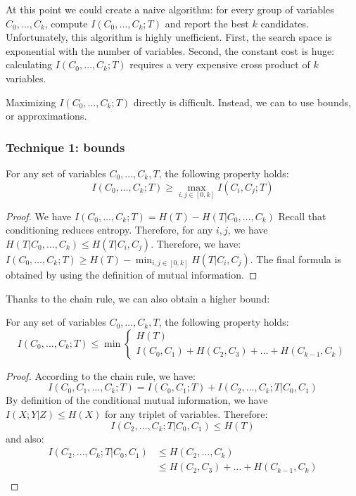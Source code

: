 At this point we could create a naive algorithm: for every group of variables
$C_0, \ldots,C_k$, compute $I(C_0, \ldots, C_k; T)$ and report the best $k$
candidates.
Unfortunately, this algorithm is highly unefficient. First, the search space is
exponential with the number of variables. Second, the constant cost is huge:
calculating $I(C_0, \ldots, C_k; T)$ requires a very expensive cross product of
$k$ variables.

Maximizing $I(C_0, \ldots, C_k; T)$ directly is difficult.  Instead, we can
to use bounds, or approximations.

\subsubsection{Technique 1: bounds}

\begin{lemma}
    For any set of variables $C_0, \ldots, C_k, T$, the following property holds:
    $$
        I(C_0, \ldots, C_k; T) \geq \max_{i,j\in [0,k]} I(C_i, C_j ; T)
    $$
\end{lemma}

\begin{proof}
    We have $I(C_0, \ldots, C_k; T) = H(T) - H(T|C_0, \ldots, C_k)$ Recall that
    conditioning reduces entropy. Therefore, for any $i,j$, we have $H(T|C_0,
    \ldots, C_k) \leq H(T |C_i, C_j)$. Therefore, we have:
    $I(C_0, \ldots, C_k; T) \geq H(T) - \min_{i,j\in [0,k]} H(T | C_i, C_j)$.
    The final formula is obtained by using the definition of mutual
    information.
\end{proof}

Thanks to the chain rule, we can also obtain a higher bound:

\begin{lemma}
    For any set of variables $C_0, \ldots, C_k, T$, the following property holds:
    \[ 
    I(C_0, \ldots, C_k; T) \leq \min
    \begin{cases}
        H(T)\\
        I(C_0, C_1) + H(C_2, C_3) + \ldots + H(C_{k-1}, C_k)
    \end{cases}
   \] 
\end{lemma}

\begin{proof}
According to the chain rule, we have: 
$$
I(C_0, C_1, \ldots, C_k;T) = I(C_0, C_1 ; T) + I(C_2,\ldots,C_k ; T | C_0, C_1)
$$
By definition of the conditional mutual information, we have $I(X;Y|Z) \leq
H(X)$ for any triplet of variables. Therefore:
\[
    I(C_2,\ldots,C_k ; T | C_0, C_1) \leq H(T)
\]and also:
\[
    \begin{split}
        I(C_2,\ldots,C_k ; T | C_0, C_1) & \leq H(C_2,\ldots,C_k)\\
        & \leq H(C_2, C_3) + \ldots + H(C_{k-1},C_k)\\
    \end{split}
\]
\end{proof}

